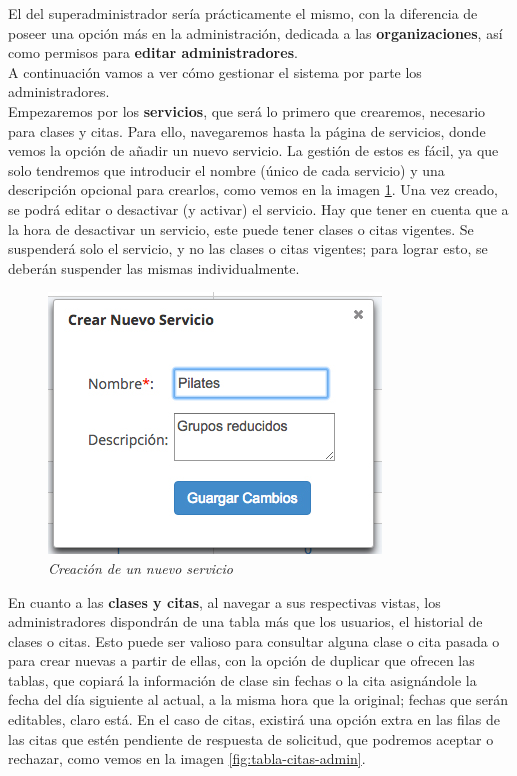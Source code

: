 El del superadministrador sería prácticamente el mismo, con la diferencia de poseer una opción más en la administración, dedicada a las \textbf{organizaciones}, así como permisos para \textbf{editar administradores}.\\

A continuación vamos a ver cómo gestionar el sistema por parte los administradores. \\

Empezaremos por los \textbf{servicios}, que será lo primero que crearemos, necesario para clases y citas. Para ello, navegaremos hasta la página de servicios, donde vemos la opción de añadir un nuevo servicio. La gestión de estos es fácil, ya que solo tendremos que introducir el nombre (único de cada servicio) y una descripción opcional para crearlos, como vemos en la imagen \ref{fig:nuevo-servicio}. Una vez creado, se podrá editar o desactivar (y activar) el servicio. Hay que tener en cuenta que a la hora de desactivar un servicio, este puede tener clases o citas vigentes. Se suspenderá solo el servicio, y no las clases o citas vigentes; para lograr esto, se deberán suspender las mismas individualmente. \\

\begin{figure}
\centering
  \includegraphics[scale=.70]{img/manual/crear-nuevo-servicio.jpg}
  \caption{\textit{Creación de un nuevo servicio}}
  \label{fig:nuevo-servicio}
\end{figure}

En cuanto a las \textbf{clases y citas}, al navegar a sus respectivas vistas, los administradores dispondrán de una tabla más que los usuarios, el historial de clases o citas. Esto puede ser valioso para consultar alguna clase o cita pasada o para crear nuevas a partir de ellas, con la opción de duplicar que ofrecen las tablas, que copiará la información de clase sin fechas o la cita asignándole la fecha del día siguiente al actual, a la misma hora que la original; fechas que serán editables, claro está. En el caso de citas, existirá una opción extra en las filas de las citas que estén pendiente de respuesta de solicitud, que podremos aceptar o rechazar, como vemos en la imagen \ref{fig:tabla-citas-admin}. \\

